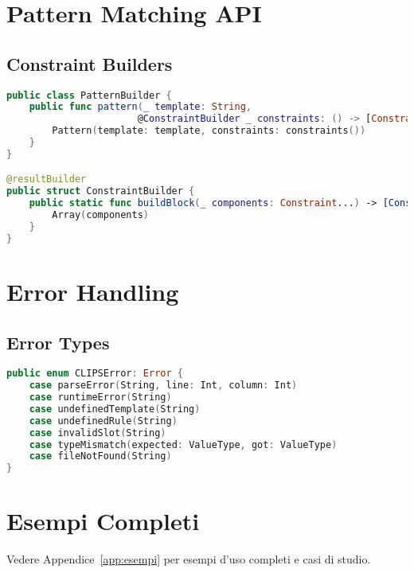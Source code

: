 \section{Pattern Matching API}

\subsection{Constraint Builders}

\begin{lstlisting}[language=Swift]
public class PatternBuilder {
    public func pattern(_ template: String, 
                       @ConstraintBuilder _ constraints: () -> [Constraint]) -> Pattern {
        Pattern(template: template, constraints: constraints())
    }
}

@resultBuilder
public struct ConstraintBuilder {
    public static func buildBlock(_ components: Constraint...) -> [Constraint] {
        Array(components)
    }
}
\end{lstlisting}

\section{Error Handling}

\subsection{Error Types}

\begin{lstlisting}[language=Swift]
public enum CLIPSError: Error {
    case parseError(String, line: Int, column: Int)
    case runtimeError(String)
    case undefinedTemplate(String)
    case undefinedRule(String)
    case invalidSlot(String)
    case typeMismatch(expected: ValueType, got: ValueType)
    case fileNotFound(String)
}
\end{lstlisting}

\section{Esempi Completi}

Vedere Appendice~\ref{app:esempi} per esempi d'uso completi e casi di studio.

